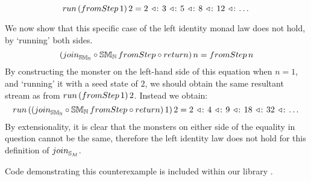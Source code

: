 $$
\strun\,(\fromstepstr\, 1)\, 2 = 2\, \acons\, 3\, \acons\, 5\, \acons\, 8\, \acons\, 12\, \acons\, \dots
$$

We now show that this specific case of the left identity monad law does not hold, by `running' both sides.
$$
(\join_{\stmon{\nat}} \comp \stmon{\nat}\, \fromstepstr \comp \return)\, n = \fromstepstr\, n
$$
By constructing the monster on the left-hand side of this equation when $n = 1$, and `running' it with a seed state of $2$, we should obtain the same resultant stream as from $\strun\,(\fromstepstr\, 1)\, 2$. Instead we obtain:
$$
\strun\, ((\join_{\stmon{\nat}} \comp \stmon{\nat}\, \fromstepstr \comp \return)\, 1)\, 2 = 2\, \acons\, 4\, \acons\, 9\, \acons\, 18\, \acons\, 32\, \acons\, \dots
$$
By extensionality, it is clear that the monsters on either side of the equality in question cannot be the same, therefore the left identity law does not hold for this definition of $\join_{\stream{M}}$.

Code demonstrating this counterexample is included within our library . 




